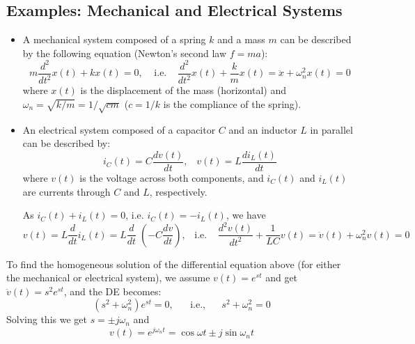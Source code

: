\begin{itemize}
\subsection*{Examples: Mechanical and Electrical Systems}

\begin{itemize}
\item A mechanical system composed of a spring $k$ and a mass $m$ can be 
  described by the following equation (Newton's second law $f=ma$):
  \[ m\frac{d^2}{dt^2}x(t)+kx(t)=0,\;\;\;\;\mbox{i.e.}\;\;\;\;
  \frac{d^2}{dt^2}x(t)+\frac{k}{m}x(t)=\ddot{x}+\omega_n^2 x(t)=0	\]
  where $x(t)$ is the displacement of the mass (horizontal) and 
  $\omega_n=\sqrt{k/m}=1/\sqrt{cm}$ ($c=1/k$ is the compliance of the spring).

\item An electrical system composed of a capacitor $C$ and an inductor $L$
  in parallel can be described by:
  \[	i_C(t)=C\frac{dv(t)}{dt},\;\;\;v(t)=L\frac{di_L(t)}{dt}	\]
  where $v(t)$ is the voltage across both components, and $i_C(t)$ and $i_L(t)$
  are currents through $C$ and $L$, respectively. 


  As $i_C(t)+i_L(t)=0$, i.e. $i_C(t)=-i_L(t)$, we have
  \[ v(t)=L\frac{d}{dt}i_L(t)=L\frac{d}{dt}\;(-C\frac{dv}{dt}),\;\;\;
  \mbox{i.e.}\;\;\;\;\frac{d^2v(t)}{dt^2}+\frac{1}{LC}v(t)
  =\ddot{v}(t)+\omega_n^2 v(t)=0	\]

\end{itemize}

To find the homogeneous solution of the differential equation above 
(for either the mechanical or electrical system), we assume $v(t)=e^{st}$ 
and get $\ddot{v}(t)=s^2 e^{st}$, and the DE becomes:
\[ (s^2+\omega_n^2) e^{st}=0,\;\;\;\;\;\;\mbox{i.e.,}\;\;\;\;\;\;
s^2+\omega_n^2=0 \]
Solving this we get $s=\pm j\omega_n$ and 
\[ v(t)=e^{j\omega_n t}=\cos \omega t\pm j\sin \omega_n t \]


\end{itemize}
